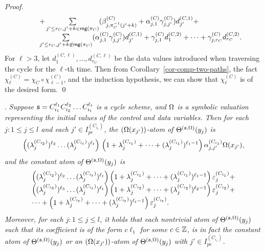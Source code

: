 \begin{appendix}
\begin{proof}
\[\begin{array}{l c l}
%
& & + \sum \limits_{j' \le r_C, j' + k \in \rng(\pi_C)} (\beta^{(C)}_{j,\pi_C^{-1}(j'+k)}+\alpha^{(C)}_{j,1} \gamma^{(C)}_{j,j'}) d^{(C,1)}_{j'} +\\
%
& & \sum \limits_{j' \le r_C, j' + k \not \in \rng(\pi_C)} (\alpha^{(C)}_{j,1} \gamma^{(C)}_{j,j'}) d^{(C,1)}_{j'} + 
 \gamma^{(C)}_{j,1} d^{(C,2)}_1 +\dots + \gamma^{(C)}_{j,r_C} d^{(C,2)}_{r_C}.
\end{array}
\] 
For $\ell > 3$, let $d^{(C,\ell)}_{1},\dots,d^{(C,\ell)}_{r_C}$ be the data values introduced when traversing the cycle for the $\ell$-th time. Then from Corollary~\ref{cor-comp-two-paths}, the fact $\chi^{(C)}_\ell = \chi_C \circ \chi^{(C)}_{\ell-1}$, and the induction hypothesis, we can show that $\chi^{(C)}_\ell$ is of the desired form.
\qed
\end{proof}


\smallskip

.
{\it 
Suppose ${\mathfrak{s} }=C_{i_1}^{\ell_1} C_{i_2}^{\ell_2} \dots C_{i_t}^{\ell_t}$ is a cycle scheme, and $\Omega$ is a symbolic valuation representing the initial values of the control and data variables. Then for each $j: 1 \le j \le l$ and each $j' \in I^{(C_{i_1})}_{pe}$, the $(\Omega(x_{j'}))$-atom of $\Theta^{({\mathfrak{s} },\Omega)}(y_j)$ is 
\[\left((\lambda^{(C_{i_2})}_{j})^{\ell_2} \dots (\lambda^{(C_{i_t})}_{j})^{\ell_t}\right) \\
\left(1+\lambda^{(C_{i_1})}_{j} + \dots + (\lambda^{(C_{i_1})}_{j})^{\ell_1-1} \right) \alpha^{(C_{i_1})}_{j,j'} \Omega(x_{j'}),\]
and the constant atom of $\Theta^{({\mathfrak{s} },\Omega)}(y_j)$ is
\[
\begin{array}{l c l}
\left((\lambda^{(C_{i_2})}_{j})^{\ell_2} \dots (\lambda^{(C_{i_t})}_{j})^{\ell_t}\right)
\left(1+\lambda^{(C_{i_1})}_{j} + \dots + (\lambda^{(C_{i_1})}_{j})^{\ell_1-1} \right) \varepsilon^{(C_{i_1})}_{j} + \\
\left((\lambda^{(C_{i_3})}_{j})^{\ell_3} \dots (\lambda^{(C_{i_t})}_{j})^{\ell_t}\right)
\left(1+\lambda^{(C_{i_2})}_{j} + \dots + (\lambda^{(C_{i_2})}_{j})^{\ell_2-1} \right) \varepsilon^{(C_{i_2})}_{j} +\\
 \dots + 
\left(1+\lambda^{(C_{i_t})}_{j} + \dots + (\lambda^{(C_{i_t})}_{j})^{\ell_t-1} \right) \varepsilon^{(C_{i_t})}_{j}.
\end{array}
\]
Moreover, for each $j: 1 \le j \le l$, it holds that each \emph{nontrivial} atom of $\Theta^{({\mathfrak{s} },\Omega)}(y_j)$ such that its coefficient is of the form $c\ell_1$ for some $c \in {\mathbb{Z} }$, is in fact the constant atom of $\Theta^{({\mathfrak{s} },\Omega)}(y_j)$ or an $(\Omega(x_{j'}))$-atom of $\Theta^{({\mathfrak{s} },\Omega)}(y_j)$ with $j' \in I^{(C_{i_1})}_{pe}$.
}



\end{appendix}
